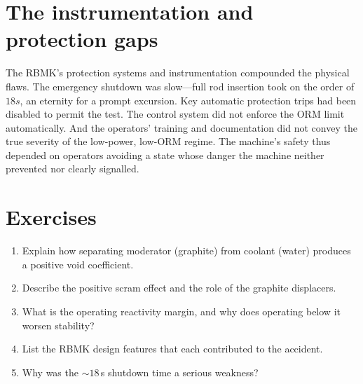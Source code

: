\section{The instrumentation and protection gaps}

The RBMK's protection systems and instrumentation compounded the physical flaws.
The emergency shutdown was slow---full rod insertion took on the order of
$18\unit{s}$, an eternity for a prompt excursion. Key automatic protection
trips had been disabled to permit the test. The control system did not enforce the
ORM limit automatically. And the operators' training and documentation did not
convey the true severity of the low-power, low-ORM regime. The machine's safety
thus depended on operators avoiding a state whose danger the machine neither
prevented nor clearly signalled.



\section*{Exercises}
\begin{enumerate}[leftmargin=*,itemsep=2pt]
\item Explain how separating moderator (graphite) from coolant (water) produces a positive void coefficient.
\item Describe the positive scram effect and the role of the graphite displacers.
\item What is the operating reactivity margin, and why does operating below it worsen stability?
\item List the RBMK design features that each contributed to the accident.
\item Why was the $\sim 18\,$s shutdown time a serious weakness?
\end{enumerate}
